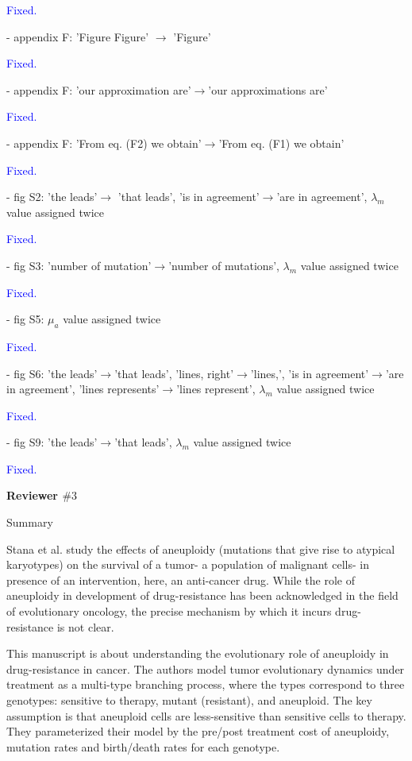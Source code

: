 \documentclass[12pt]{extarticle}
\begin{document}
\textcolor{blue}{Fixed.} %

- appendix F: 'Figure Figure' $\rightarrow$ 'Figure'

\textcolor{blue}{Fixed.} %

- appendix F: 'our approximation are'$\rightarrow$'our approximations are'

\textcolor{blue}{Fixed.}%

- appendix F: 'From eq. (F2) we obtain'$\rightarrow$'From eq. (F1) we obtain'

\textcolor{blue}{Fixed.}%

- fig S2: 'the leads'$\rightarrow$ 'that leads', 'is in agreement'$\rightarrow$'are in agreement', $\lambda_m$ value assigned twice

\textcolor{blue}{Fixed.}%

- fig S3: 'number of mutation'$\rightarrow$'number of mutations', $\lambda_m$ value assigned twice

\textcolor{blue}{Fixed.}%

- fig S5: $\mu_a$ value assigned twice

\textcolor{blue}{Fixed.} %

- fig S6: 'the leads'$\rightarrow$'that leads', 'lines, right'$\rightarrow$'lines,', 'is in agreement'$\rightarrow$'are in agreement', 'lines represents'$\rightarrow$'lines represent', $\lambda_m$ value assigned twice

\textcolor{blue}{Fixed.} %

- fig S9: 'the leads'$\rightarrow$'that leads', $\lambda_m$ value assigned twice

\textcolor{blue}{Fixed.} %

\textbf{Reviewer $\#3$}

Summary

Stana et al. study the effects of aneuploidy (mutations that give rise to atypical karyotypes) on the survival of a tumor- a population of malignant cells- in presence of an intervention, here, an anti-cancer drug. While the role of aneuploidy in development of drug-resistance has been acknowledged in the field of evolutionary oncology, the precise mechanism by which it incurs drug-resistance is not clear.

This manuscript is about understanding the evolutionary role of aneuploidy in drug-resistance in cancer. The authors model tumor evolutionary dynamics under treatment as a multi-type branching process, where the types correspond to three genotypes: sensitive to therapy, mutant (resistant), and aneuploid. The key assumption is that aneuploid cells are less-sensitive than sensitive cells to therapy. They parameterized their model by the pre/post treatment cost of aneuploidy, mutation rates and birth/death rates for each genotype.
\end{document}
